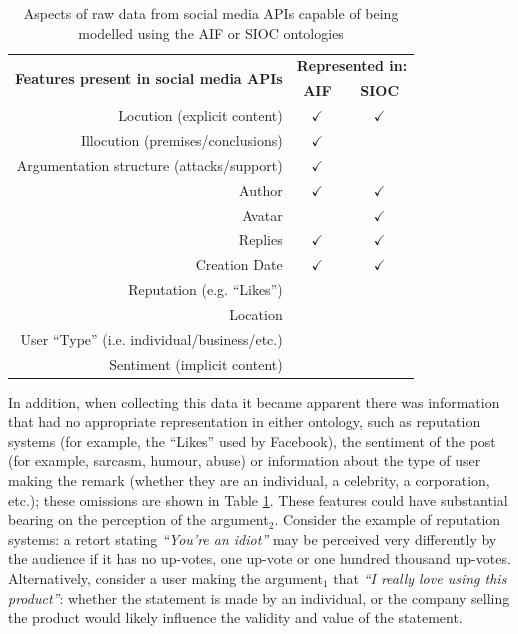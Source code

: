 \begin{table}
\centering
\caption{Aspects of raw data from social media APIs capable of being modelled using the AIF or SIOC ontologies}
\label{table:method:features}
\begin{tabular}{ r | c | c }

\multirow{2}{*}{\textbf{Features present in social media APIs}} & \multicolumn{2}{c}{\textbf{Represented in:}}\\

 & \textbf{AIF} & \textbf{SIOC} \\
\hline
Locution (explicit content)& $\checkmark$ & $\checkmark$ \\

Illocution (premises/conclusions) & $\checkmark$ & \\

Argumentation structure (attacks/support) & $\checkmark$ & \\

Author  		& $\checkmark$ & $\checkmark$ \\

Avatar  		&  			   & $\checkmark$ \\

Replies 		& $\checkmark$ & $\checkmark$ \\

Creation Date  	& $\checkmark$ & $\checkmark$ \\

Reputation (e.g. ``Likes'')  &  &  \\

Location  &  &  \\

User ``Type'' (i.e. individual/business/etc.)  &  &  \\

Sentiment (implicit content) &  &  \\

\end{tabular}
\end{table}

In addition, when collecting this data it became apparent there was information that had no appropriate representation in either ontology, such as reputation systems (for example, the ``Likes'' used by Facebook), the sentiment of the post (for example, sarcasm, humour, abuse) or information about the type of user making the remark (whether they are an individual, a celebrity, a corporation, etc.); these omissions are shown in Table \ref{table:method:features}. These features could have substantial bearing on the perception of the argument$_2$. Consider the example of reputation systems: a retort stating \textit{``You're an idiot''} may be perceived very differently by the audience if it has no up-votes, one up-vote or one hundred thousand up-votes. Alternatively, consider a user making the argument$_1$ that \textit{``I really love using this product''}: whether the statement is made by an individual, or the company selling the product would likely influence the validity and value of the statement.

